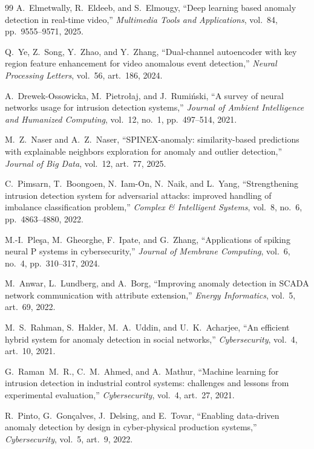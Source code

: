 \documentclass[12pt,a4paper]{report}
\begin{document}
\begin{thebibliography}{99}
A.~Elmetwally, R.~Eldeeb, and S.~Elmougy, ``Deep learning based anomaly detection in real-time video,'' \textit{Multimedia Tools and Applications}, vol.~84, pp.~9555--9571, 2025.

Q.~Ye, Z.~Song, Y.~Zhao, and Y.~Zhang, ``Dual-channel autoencoder with key region feature enhancement for video anomalous event detection,'' \textit{Neural Processing Letters}, vol.~56, art.~186, 2024.

A.~Drewek-Ossowicka, M.~Pietro{\l}aj, and J.~Rumi{\'n}ski, ``A survey of neural networks usage for intrusion detection systems,'' \textit{Journal of Ambient Intelligence and Humanized Computing}, vol.~12, no.~1, pp.~497--514, 2021.

M.~Z.~Naser and A.~Z.~Naser, ``SPINEX-anomaly: similarity-based predictions with explainable neighbors exploration for anomaly and outlier detection,'' \textit{Journal of Big Data}, vol.~12, art.~77, 2025.

C.~Pimsarn, T.~Boongoen, N.~Iam-On, N.~Naik, and L.~Yang, ``Strengthening intrusion detection system for adversarial attacks: improved handling of imbalance classification problem,'' \textit{Complex \& Intelligent Systems}, vol.~8, no.~6, pp.~4863--4880, 2022.

M.-I.~Ple{\c{s}}a, M.~Gheorghe, F.~Ipate, and G.~Zhang, ``Applications of spiking neural P systems in cybersecurity,'' \textit{Journal of Membrane Computing}, vol.~6, no.~4, pp.~310--317, 2024.

M.~Anwar, L.~Lundberg, and A.~Borg, ``Improving anomaly detection in SCADA network communication with attribute extension,'' \textit{Energy Informatics}, vol.~5, art.~69, 2022.

M.~S.~Rahman, S.~Halder, M.~A.~Uddin, and U.~K.~Acharjee, ``An efficient hybrid system for anomaly detection in social networks,'' \textit{Cybersecurity}, vol.~4, art.~10, 2021.

G.~Raman~M.~R., C.~M.~Ahmed, and A.~Mathur, ``Machine learning for intrusion detection in industrial control systems: challenges and lessons from experimental evaluation,'' \textit{Cybersecurity}, vol.~4, art.~27, 2021.

R.~Pinto, G.~Gon{\c{c}}alves, J.~Delsing, and E.~Tovar, ``Enabling data-driven anomaly detection by design in cyber-physical production systems,'' \textit{Cybersecurity}, vol.~5, art.~9, 2022.

\end{thebibliography}
\end{document}
